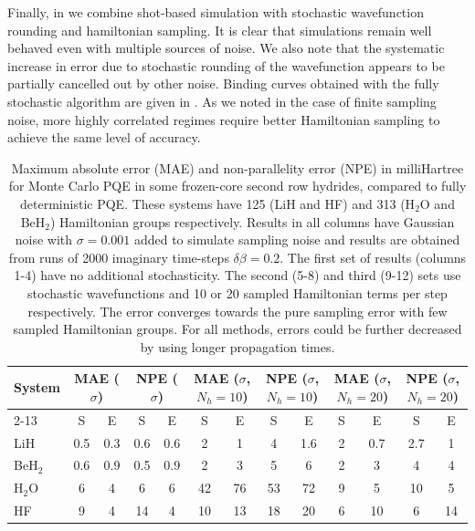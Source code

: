 \documentclass[%
 reprint,
 amsmath,amssymb,
 aps,
]{revtex4-2}
\begin{document}
Finally, in  we combine shot-based simulation with stochastic wavefunction rounding and hamiltonian sampling. It is clear that simulations remain well behaved even with multiple sources of noise. We also note that the systematic increase in error due to stochastic rounding of the wavefunction appears to be partially cancelled out by other noise. Binding curves obtained with the fully stochastic algorithm are given in . As we noted in the case of finite sampling noise, more highly correlated regimes require better Hamiltonian sampling to achieve the same level of accuracy.

\begin{table}
    \centering
    \begin{tabular}{l||c|c|c|c||c|c|c|c||c|c|c|c}
      \multirow{2}{*}{System} &  \multicolumn{2}{c|}{MAE ($\sigma$)} & \multicolumn{2}{c||}{NPE ($\sigma$)} & \multicolumn{2}{c|}{MAE ($\sigma$, $N_h = 10$)} & \multicolumn{2}{c||}{NPE ($\sigma$, $N_h = 10$)} & \multicolumn{2}{c|}{MAE ($\sigma$, $N_h = 20$)} &\multicolumn{2}{c}{NPE ($\sigma$, $N_h = 20$)}\\
      \cline{2-13}
      & S & E& S & E& S & E& S & E& S & E& S & E\\
      \hline
        LiH & 0.5 & 0.3 & 0.6 & 0.6 & \hspace*{5mm}2\hspace*{5mm} & 1& \hspace*{5mm}4\hspace*{5mm} &1.6&\hspace*{5mm}2\hspace*{5mm} &0.7 &\hspace*{4mm}2.7\hspace*{4mm}&1\\
         BeH$_2$ & 0.6 & 0.9 & 0.5 & 0.9 & 2 & 3 & 5 & 6 &2&3&4&4 \\
         H$_2$O & 6 & 4 & 6& 6& 42 &76 & 53& 72&9&5& 10& 5 \\
         HF& 9 & 4& 14 & 4 & 10& 13& 18 & 20 & 6 & 10 & 6 &14\\
         \hline
    \end{tabular}
    \caption{\small \justifying Maximum absolute error (MAE) and non-parallelity error (NPE) in milliHartree for Monte Carlo PQE in some frozen-core second row hydrides, compared to fully deterministic PQE. These systems have 125 (LiH and HF) and 313 (H$_2$O and BeH$_2$) Hamiltonian groups respectively. Results in all columns have Gaussian noise with $\sigma = 0.001$ added to simulate sampling noise and results are obtained from runs of 2000 imaginary time-steps $\delta \beta = 0.2$. The first set of results (columns 1-4) have no additional stochasticity. The second (5-8) and third (9-12) sets use stochastic wavefunctions and 10 or 20 sampled Hamiltonian terms per step respectively. The error converges towards the pure sampling error with few sampled Hamiltonian groups. For all methods, errors could be further decreased by using longer propagation times.}
    \label{tab:hydrides}
\end{table}
\end{document}
